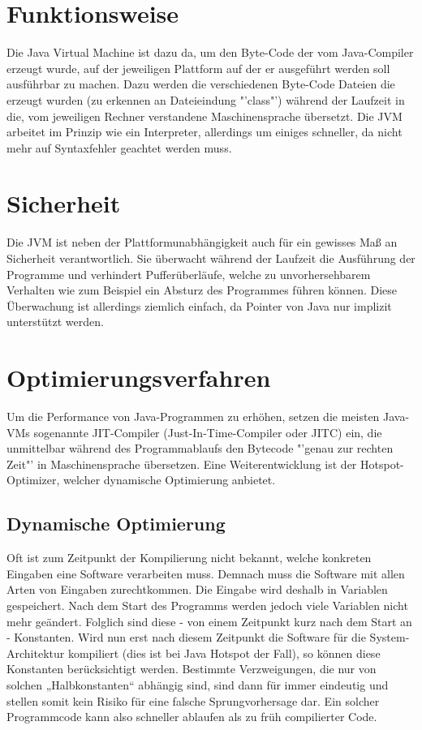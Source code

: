 \documentclass[a4paper,14pt]{scrreprt}
\begin{document}
\section{Funktionsweise}
Die Java Virtual Machine ist dazu da, um den Byte-Code der vom Java-Compiler erzeugt wurde, auf der jeweiligen Plattform auf der er ausgeführt werden soll ausführbar zu machen. Dazu werden die verschiedenen Byte-Code Dateien die erzeugt wurden (zu erkennen an Dateieindung "'class"') während der Laufzeit in die, vom jeweiligen Rechner verstandene Maschinensprache übersetzt. Die JVM arbeitet im Prinzip wie ein Interpreter, allerdings um einiges schneller, da nicht mehr auf Syntaxfehler geachtet werden muss. 
\section{Sicherheit}
Die JVM ist neben der Plattformunabhängigkeit auch für ein gewisses Maß an Sicherheit verantwortlich. Sie überwacht während der Laufzeit die Ausführung der Programme und verhindert Pufferüberläufe, welche zu unvorhersehbarem Verhalten wie zum Beispiel ein Absturz des Programmes führen können. Diese Überwachung ist allerdings ziemlich einfach, da Pointer von Java nur implizit unterstützt werden.
\section{Optimierungsverfahren}
Um die Performance von Java-Programmen zu erhöhen, setzen die meisten Java-VMs sogenannte JIT-Compiler (Just-In-Time-Compiler oder JITC) ein, die unmittelbar während des Programmablaufs den Bytecode "'genau zur rechten Zeit"' in Maschinensprache übersetzen. Eine Weiterentwicklung ist der Hotspot-Optimizer, welcher dynamische Optimierung anbietet.
\subsection{Dynamische Optimierung}
Oft ist zum Zeitpunkt der Kompilierung nicht bekannt, welche konkreten Eingaben eine Software verarbeiten muss. Demnach muss die Software mit allen Arten von Eingaben zurechtkommen. Die Eingabe wird deshalb in Variablen gespeichert. Nach dem Start des Programms werden jedoch viele Variablen nicht mehr geändert. Folglich sind diese - von einem Zeitpunkt kurz nach dem Start an - Konstanten. Wird nun erst nach diesem Zeitpunkt die Software für die System-Architektur kompiliert (dies ist bei Java Hotspot der Fall), so können diese Konstanten berücksichtigt werden. Bestimmte Verzweigungen, die nur von solchen „Halbkonstanten“ abhängig sind, sind dann für immer eindeutig und stellen somit kein Risiko für eine falsche Sprungvorhersage dar. Ein solcher Programmcode kann also schneller ablaufen als zu früh compilierter Code.
\end{document}
